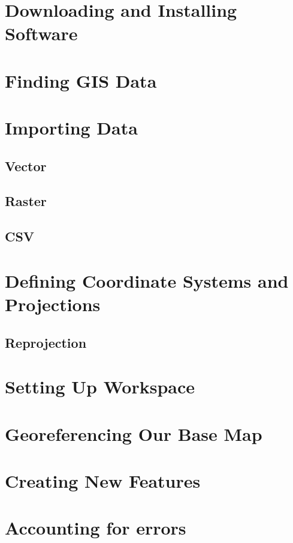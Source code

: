 \documentclass{article}
\begin{document}
\section{Downloading and Installing Software}

\section{Finding GIS Data}

\section{Importing Data}

\subsection{Vector}

\subsection{Raster}

\subsection{CSV}

\section{Defining Coordinate Systems and Projections}

\subsection{Reprojection}

\section{Setting Up Workspace}

\section{Georeferencing Our Base Map}

\section{Creating New Features}

\section{Accounting for errors}
\end{document}
